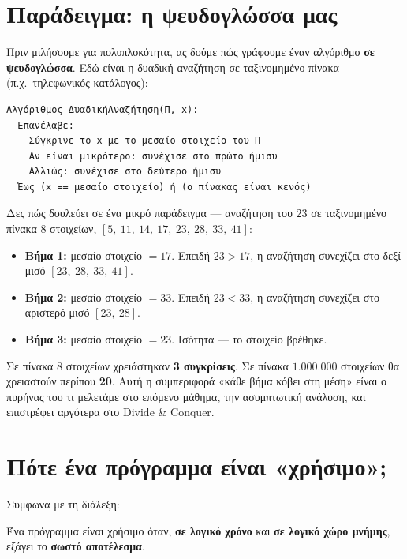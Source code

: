 \documentclass[11pt,a4paper]{article}
\begin{document}
\section{Παράδειγμα: η ψευδογλώσσα μας}

Πριν μιλήσουμε για πολυπλοκότητα, ας δούμε πώς γράφουμε έναν αλγόριθμο
\textbf{σε ψευδογλώσσα}. Εδώ είναι η δυαδική αναζήτηση σε ταξινομημένο πίνακα
(π.χ.\ τηλεφωνικός κατάλογος):

\begin{codebox}
\begin{verbatim}
Αλγόριθμος ΔυαδικήΑναζήτηση(Π, x):
  Επανέλαβε:
    Σύγκρινε το x με το μεσαίο στοιχείο του Π
    Αν είναι μικρότερο: συνέχισε στο πρώτο ήμισυ
    Αλλιώς: συνέχισε στο δεύτερο ήμισυ
  Έως (x == μεσαίο στοιχείο) ή (ο πίνακας είναι κενός)
\end{verbatim}
\end{codebox}

Δες πώς δουλεύει σε ένα μικρό παράδειγμα --- αναζήτηση του $23$ σε ταξινομημένο
πίνακα $8$ στοιχείων, $[5,\ 11,\ 14,\ 17,\ 23,\ 28,\ 33,\ 41]$:

\begin{itemize}
  \item \textbf{Βήμα 1:} μεσαίο στοιχείο $=17$. Επειδή $23 > 17$, η αναζήτηση
  συνεχίζει στο δεξί μισό $[23,\ 28,\ 33,\ 41]$.
  \item \textbf{Βήμα 2:} μεσαίο στοιχείο $=33$. Επειδή $23 < 33$, η αναζήτηση
  συνεχίζει στο αριστερό μισό $[23,\ 28]$.
  \item \textbf{Βήμα 3:} μεσαίο στοιχείο $=23$. Ισότητα --- το στοιχείο βρέθηκε.
\end{itemize}

Σε πίνακα $8$ στοιχείων χρειάστηκαν \textbf{3 συγκρίσεις}. Σε πίνακα
$1{.}000{.}000$ στοιχείων θα χρειαστούν περίπου \textbf{20}. Αυτή η συμπεριφορά
«κάθε βήμα κόβει στη μέση» είναι ο πυρήνας του τι μελετάμε στο επόμενο μάθημα, την
ασυμπτωτική ανάλυση, και επιστρέφει αργότερα στο Divide \& Conquer.

\section{Πότε ένα πρόγραμμα είναι «χρήσιμο»;}

Σύμφωνα με τη διάλεξη:

\begin{quoteblock}
Ένα πρόγραμμα είναι χρήσιμο όταν, \textbf{σε λογικό χρόνο} και \textbf{σε λογικό
χώρο μνήμης}, εξάγει το \textbf{σωστό αποτέλεσμα}.
\end{quoteblock}
\end{document}
